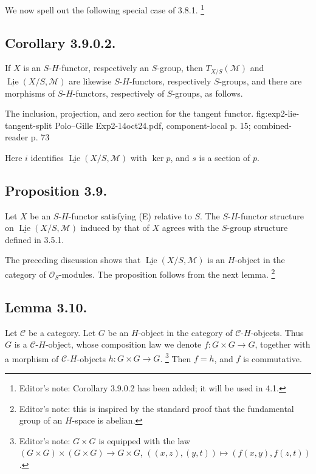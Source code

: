 We now spell out the following special case of 3.8.1.
\footnote{Editor's note: Corollary 3.9.0.2 has been added; it will be used
in 4.1.}

\subsection*{Corollary 3.9.0.2.}
If \(X\) is an \(S\)-\(H\)-functor, respectively an \(S\)-group, then
\(T_{X/S}(\mathcal M)\) and
\(\underline{\operatorname{Lie}}(X/S,\mathcal M)\) are likewise
\(S\)-\(H\)-functors, respectively \(S\)-groups, and there are morphisms
of \(S\)-\(H\)-functors, respectively of \(S\)-groups, as follows.

  {The inclusion, projection, and zero section for the tangent functor.}
  {fig:exp2-lie-tangent-split}
  {Polo--Gille Exp2-14oct24.pdf, component-local p. 15; combined-reader p. 73}

Here \(i\) identifies \(\underline{\operatorname{Lie}}(X/S,\mathcal M)\)
with \(\ker p\), and \(s\) is a section of \(p\).

\subsection*{Proposition 3.9.}
Let \(X\) be an \(S\)-\(H\)-functor satisfying (E) relative to \(S\).
The \(S\)-\(H\)-functor structure on
\(\underline{\operatorname{Lie}}(X/S,\mathcal M)\) induced by that of
\(X\) agrees with the \(S\)-group structure defined in 3.5.1.

The preceding discussion shows that
\(\underline{\operatorname{Lie}}(X/S,\mathcal M)\) is an \(H\)-object in
the category of \(\mathcal O_S\)-modules. The proposition follows from
the next lemma.
\footnote{Editor's note: this is inspired by the standard proof that the
fundamental group of an \(H\)-space is abelian.}

\subsection*{Lemma 3.10.}
Let \(\mathscr C\) be a category. Let \(G\) be an \(H\)-object in the
category of \(\mathscr C\)-\(H\)-objects. Thus \(G\) is a
\(\mathscr C\)-\(H\)-object, whose composition law we denote
\(f:G\times G\to G\), together with a morphism of
\(\mathscr C\)-\(H\)-objects \(h:G\times G\to G\).
\footnote{Editor's note: \(G\times G\) is equipped with the law
\((G\times G)\times(G\times G)\to G\times G\),
\(((x,z),(y,t))\mapsto(f(x,y),f(z,t))\).}
Then \(f=h\), and \(f\) is commutative.

